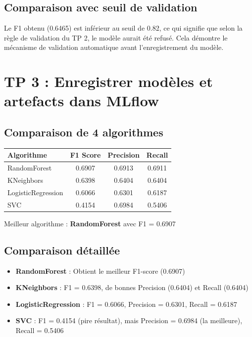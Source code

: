 \documentclass[12pt,a4paper]{report}
\begin{document}
\section{Comparaison avec seuil de validation}
Le F1 obtenu (0.6465) est inférieur au seuil de 0.82, ce qui signifie que selon la règle de validation du TP 2, le modèle aurait été refusé. Cela démontre le mécanisme de validation automatique avant l'enregistrement du modèle.

\chapter{TP 3 : Enregistrer modèles et artefacts dans MLflow}

\section{Comparaison de 4 algorithmes}
\begin{table}[h!]
\centering
\begin{tabular}{lccc}
\hline
\textbf{Algorithme} & \textbf{F1 Score} & \textbf{Precision} & \textbf{Recall} \\
\hline
RandomForest & 0.6907 & 0.6913 & 0.6911 \\
KNeighbors & 0.6398 & 0.6404 & 0.6404 \\
LogisticRegression & 0.6066 & 0.6301 & 0.6187 \\
SVC & 0.4154 & 0.6984 & 0.5406 \\
\hline
\end{tabular}
\end{table}

Meilleur algorithme : \textbf{RandomForest} avec F1 = 0.6907

\section{Comparaison détaillée}
\begin{itemize}
    \item \textbf{RandomForest} : Obtient le meilleur F1-score (0.6907)
    \item \textbf{KNeighbors} : F1 = 0.6398, de bonnes Precision (0.6404) et Recall (0.6404)
    \item \textbf{LogisticRegression} : F1 = 0.6066, Precision = 0.6301, Recall = 0.6187
    \item \textbf{SVC} : F1 = 0.4154 (pire résultat), mais Precision = 0.6984 (la meilleure), Recall = 0.5406
\end{itemize}
\end{document}
